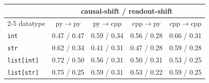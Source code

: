 \begin{tabular}{lcccc}
\toprule
& \multicolumn{4}{c}{causal-shift / readout-shift} \\
\cmidrule(lr){2-5}
datatype & py$\to$py & py$\to$cpp & cpp$\to$py & cpp$\to$cpp \\
\midrule
\texttt{int} & 0.47 / 0.47 & 0.59 / 0.34 & 0.56 / 0.28 & 0.66 / 0.31 \\
\texttt{str} & 0.62 / 0.34 & 0.41 / 0.31 & 0.47 / 0.28 & 0.59 / 0.28 \\
\texttt{list[int]} & 0.72 / 0.50 & 0.56 / 0.31 & 0.50 / 0.31 & 0.53 / 0.25 \\
\texttt{list[str]} & 0.75 / 0.25 & 0.59 / 0.31 & 0.53 / 0.22 & 0.59 / 0.25 \\
\bottomrule
\end{tabular}
